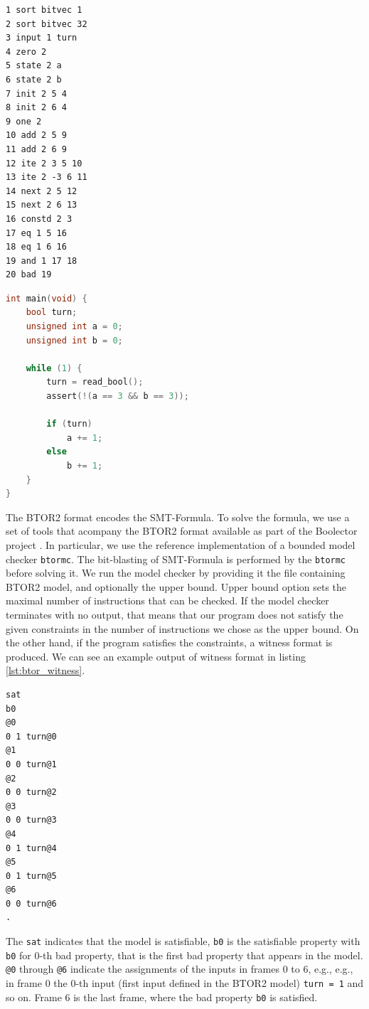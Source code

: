\documentclass[12pt]{article}
\begin{document}
\begin{lstlisting}[label=lst:btor2_example, caption={Example BTOR2 model for \texttt{C} code in listing \ref{lst:c_code}},captionpos=b]
1 sort bitvec 1
2 sort bitvec 32
3 input 1 turn
4 zero 2
5 state 2 a
6 state 2 b
7 init 2 5 4
8 init 2 6 4
9 one 2
10 add 2 5 9
11 add 2 6 9
12 ite 2 3 5 10
13 ite 2 -3 6 11
14 next 2 5 12
15 next 2 6 13
16 constd 2 3
17 eq 1 5 16
18 eq 1 6 16
19 and 1 17 18
20 bad 19
\end{lstlisting}

\begin{lstlisting}[label=lst:c_code, language=c, caption={\texttt{C} code we generate a model from},captionpos=b]
int main(void) {
    bool turn;
    unsigned int a = 0;
    unsigned int b = 0;

    while (1) {
        turn = read_bool();
        assert(!(a == 3 && b == 3));

        if (turn)
            a += 1;
        else
            b += 1;
    }
}
\end{lstlisting}

The BTOR2 format encodes the SMT-Formula. To solve the formula, we use a set of
tools that acompany the BTOR2 format available as part of the Boolector project
\cite{DBLP:journals/jsat/NiemetzPB14}. In particular, we use the reference
implementation of a bounded model checker \texttt{btormc}. The bit-blasting of
SMT-Formula is performed by the \texttt{btormc} before solving it. We run the
model checker by providing it the file containing BTOR2 model, and optionally
the upper bound. Upper bound option sets the maximal number of instructions
that can be checked. If the model checker terminates with no output, that means
that our program does not satisfy the given constraints in the number of
instructions we chose as the upper bound. On the other hand, if the program
satisfies the constraints, a witness format is produced. We can see an example
output of witness format in listing \ref{lst:btor_witness}.

\begin{lstlisting}[label=lst:btor_witness, caption={BTOR2 Witness Format for model in listing \ref{lst:btor2_example}}, captionpos=b]
sat
b0
@0
0 1 turn@0
@1
0 0 turn@1
@2
0 0 turn@2
@3
0 0 turn@3
@4
0 1 turn@4
@5
0 1 turn@5
@6
0 0 turn@6
.
\end{lstlisting}

The \texttt{sat} indicates that the model is satisfiable, \texttt{b0} is the 
satisfiable property with \texttt{b0} for 0-th bad property, that is the first
bad property that appears in the model. \texttt{@0} through \texttt{@6}
indicate the assignments of the inputs in frames 0 to 6, e.g., e.g., in frame
0 the 0-th input (first input defined in the BTOR2 model) \texttt{turn = 1} and
so on. Frame 6 is the last frame, where the bad property \texttt{b0} is
satisfied.
\end{document}
